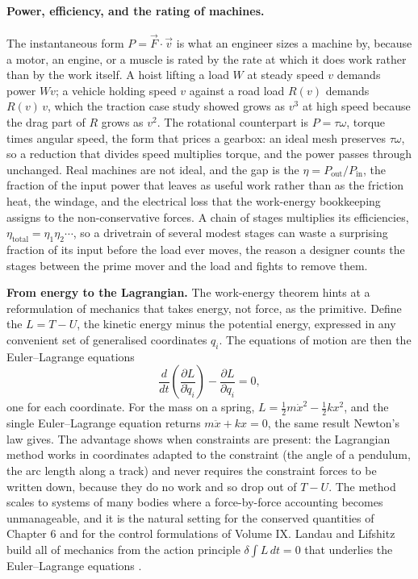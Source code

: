 \paragraph{Power, efficiency, and the rating of machines.} The
instantaneous form $P=\vec{F}\cdot\vec{v}$ is what an engineer sizes a
machine by, because a motor, an engine, or a muscle is rated by the rate
at which it does work rather than by the work itself. A hoist lifting a
load $W$ at steady speed $v$ demands power $Wv$; a vehicle holding speed
$v$ against a road load $R(v)$ demands $R(v)\,v$, which the traction case
study showed grows as $v^{3}$ at high speed because the drag part of
$R$ grows as $v^{2}$. The rotational counterpart is $P=\tau\omega$,
torque times angular speed, the form that prices a gearbox: an ideal
mesh preserves $\tau\omega$, so a reduction that divides speed multiplies
torque, and the power passes through unchanged. Real machines are not
ideal, and the gap is the  $\eta=P_{\text{out}}/
P_{\text{in}}$, the fraction of the input power that leaves as useful
work rather than as the friction heat, the windage, and the electrical
loss that the work-energy bookkeeping assigns to the non-conservative
forces. A chain of stages multiplies its efficiencies, $\eta_{\text{
total}}=\eta_{1}\eta_{2}\cdots$, so a drivetrain of several modest stages
can waste a surprising fraction of its input before the load ever moves,
the reason a designer counts the stages between the prime mover and the
load and fights to remove them.

\begin{mastery}
\textbf{From energy to the Lagrangian.} The work-energy theorem hints
at a reformulation of mechanics that takes energy, not force, as the
primitive. Define the  $L=T-U$, the kinetic energy
minus the potential energy, expressed in any convenient set of
generalised coordinates $q_{i}$. The equations of motion are then the
Euler--Lagrange equations
\[
\frac{d}{dt}\!\left(\frac{\partial L}{\partial \dot{q}_{i}}\right)
-\frac{\partial L}{\partial q_{i}}=0,
\]
one for each coordinate. For the mass on a spring, $L=\tfrac{1}{2}m
\dot{x}^{2}-\tfrac{1}{2}kx^{2}$, and the single Euler--Lagrange
equation returns $m\ddot{x}+kx=0$, the same result Newton's law gives.
The advantage shows when constraints are present: the Lagrangian
method works in coordinates adapted to the constraint (the angle of a
pendulum, the arc length along a track) and never requires the
constraint forces to be written down, because they do no work and so
drop out of $T-U$. The method scales to systems of many bodies where a
force-by-force accounting becomes unmanageable, and it is the natural
setting for the conserved quantities of Chapter 6 and for the control
formulations of Volume IX. Landau and Lifshitz build all of mechanics
from the action principle $\delta\!\int L\,dt=0$ that underlies the
Euler--Lagrange equations \cite[\S{}1--2]{text:landau-mechanics}.
\end{mastery}

